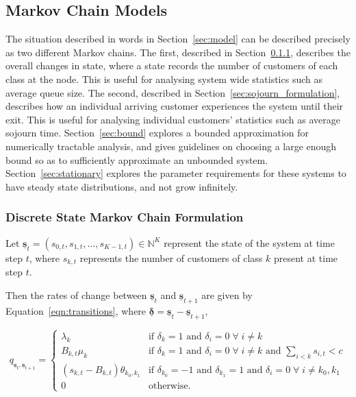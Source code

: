 \documentclass{article}
\begin{document}
\subsection{Markov Chain Models}
The situation described in words in Section~\ref{sec:model} can be described
precisely as two different Markov chains.
The first, described in Section~\ref{sec:state_formulation}, describes the
overall changes in state, where a state records the number of customers of each
class at the node. This is useful for analysing system wide statistics such as
average queue size.
The second, described in Section~\ref{sec:sojourn_formulation}, describes how an
individual arriving customer experiences the system until their exit. This is
useful for analysing individual customers' statistics such as average sojourn
time.
Section~\ref{sec:bound} explores a bounded approximation for numerically
tractable analysis, and gives guidelines on choosing a large enough bound so as
to sufficiently approximate an unbounded system.
Section~\ref{sec:stationary} explores the parameter requirements for these
systems to have steady state distributions, and not grow infinitely.

\subsubsection{Discrete State Markov Chain Formulation}\label{sec:state_formulation}
Let
$\underline{\mathbf{s}}_t = (s_{0,t}, s_{1,t}, \dots, s_{K-1,t}) \in \mathbb{N}^K$
represent the state of the system at time step $t$, where $s_{k,t}$ represents
the number of customers of class $k$ present at time step $t$.

Then the rates of change between $\underline{\mathbf{s}}_t$ and
$\underline{\mathbf{s}}_{t+1}$ are given by Equation~\ref{eqn:transitions},
where $\underline{\mathbf{\delta}} = \underline{\mathbf{s}}_t - \underline{\mathbf{s}}_{t+1}$,

\begin{equation}\label{eqn:transitions}
q_{\underline{\mathbf{s}}_t, \underline{\mathbf{s}}_{t+1}} = 
\begin{cases}
\lambda_k & \text{if } \delta_k = 1 \text{ and } \delta_i = 0 \; \forall \; i \neq k \\
B_{k,t} \mu_k & \text{if } \delta_k = 1 \text{ and } \delta_i = 0 \; \forall \; i \neq k \text{ and } \sum_{i < k} s_{i,t} < c \\
(s_{k,t} - B_{k,t}) \theta_{k_0,k_1} & \text{if } \delta_{k_0} = -1 \text{ and } \delta_{k_1} = 1 \text{ and } \delta_i = 0 \; \forall \; i \neq k_0, k_1 \\
0 & \text{otherwise.}
\end{cases}
\end{equation}
\end{document}
